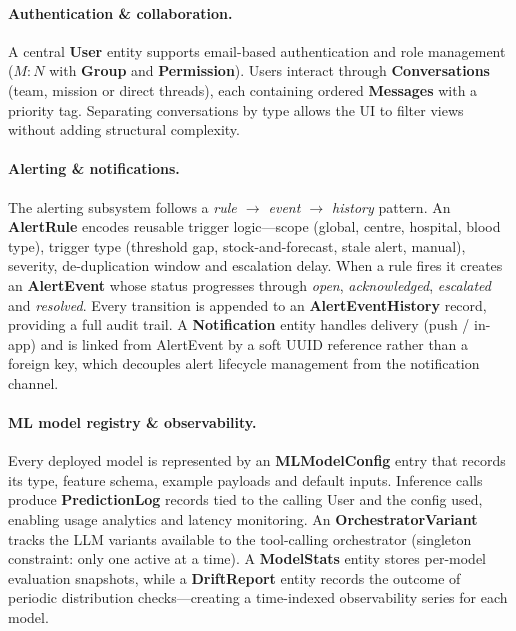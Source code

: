 \paragraph{Authentication \& collaboration.}

A central \textbf{User} entity supports email-based authentication and
role management ($M{:}N$ with \textbf{Group} and \textbf{Permission}).
Users interact through \textbf{Conversations} (team, mission or direct
threads), each containing ordered \textbf{Messages} with a priority tag.
Separating conversations by type allows the UI to filter views without
adding structural complexity.

\paragraph{Alerting \& notifications.}

The alerting subsystem follows a \emph{rule $\to$ event $\to$ history}
pattern.  An \textbf{AlertRule} encodes reusable trigger logic—scope
(global, centre, hospital, blood type), trigger type (threshold gap,
stock-and-forecast, stale alert, manual), severity, de-duplication window
and escalation delay.  When a rule fires it creates an
\textbf{AlertEvent} whose status progresses through \emph{open},
\emph{acknowledged}, \emph{escalated} and \emph{resolved}.  Every
transition is appended to an \textbf{AlertEventHistory} record, providing
a full audit trail.  A \textbf{Notification} entity handles delivery
(push / in-app) and is linked from AlertEvent by a soft UUID reference
rather than a foreign key, which decouples alert lifecycle management from
the notification channel.

\paragraph{ML model registry \& observability.}

Every deployed model is represented by an \textbf{MLModelConfig} entry
that records its type, feature schema, example payloads and default
inputs.  Inference calls produce \textbf{PredictionLog} records tied to
the calling User and the config used, enabling usage analytics and latency
monitoring.  An \textbf{OrchestratorVariant} tracks the LLM variants
available to the tool-calling orchestrator (singleton constraint: only one
active at a time).  A \textbf{ModelStats} entity stores per-model
evaluation snapshots, while a \textbf{DriftReport} entity records the
outcome of periodic distribution checks—creating a time-indexed
observability series for each model.

